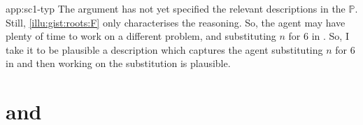 \begin{note}
\begin{dets}{app:sc1-typ}
    \noindent%
    The argument has not yet specified the relevant descriptions in the \tpro{} \(\mathbb{P}\).
    Still, \autoref{illu:gist:roots:F} only characterises the \agents{} reasoning.
    So, the agent may have plenty of time to work on a different problem, and substituting \(n\) for \(6\) in \rootsConEq{}.
    So, I take it to be plausible a description which captures the agent substituting \(n\) for \(6\) in \rootsConEq{} and then working on the substitution is plausible.
  \end{dets}
\end{note}



\section{ and }
\label{sec:tcv3-requ1}


